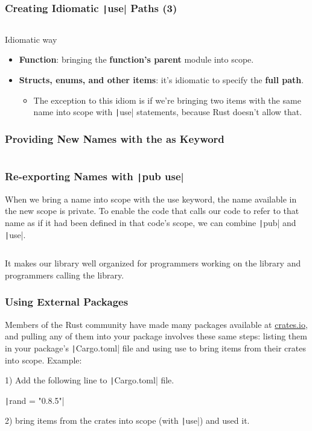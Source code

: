 \documentclass{beamer}
\begin{document}
\begin{frame}[fragile]
	\frametitle{Creating Idiomatic \texttt|use| Paths (3)}
	\inputminted[fontsize=\scriptsize]{rust}{./code/module10.rs}
	
	\begin{block}{Idiomatic way}
		\begin{itemize}
			\item 	\textbf{Function}: bringing the \textbf{function’s parent} module into scope.
			\item 	\textbf{Structs, enums, and other items}: it’s idiomatic to specify the \textbf{full path}.
			\begin{itemize}
				\item The exception to this idiom is if we’re bringing two items with the same name into scope with \texttt|use|  statements, because Rust doesn’t allow that.
			\end{itemize}
		\end{itemize}
	\end{block}
	
\end{frame}



\begin{frame}[fragile]
	\frametitle{Providing New Names with the as Keyword}
	\inputminted[fontsize=\scriptsize]{rust}{./code/module11.rs}
\end{frame}



\begin{frame}[fragile]
	\frametitle{Re-exporting Names with \texttt|pub use|}
	When we bring a name into scope with the use keyword, the name available in the new scope is private. To enable the code that calls our code to refer to that name as if it had been defined in that code’s scope, we can combine  \texttt|pub| and  \texttt|use|.
	
	\inputminted[fontsize=\scriptsize]{rust}{./code/module12.rs}
	
	\scriptsize
	It makes our library well organized for programmers working on the library and programmers calling the library. 
\end{frame}



\begin{frame}[fragile]
	\frametitle{Using External Packages}
	Members of the Rust community have made many packages available at \url{crates.io}, and pulling any of them into your package involves these same steps: listing them in your package’s \texttt|Cargo.toml| file and using use to bring items from their crates into scope. Example:
	
	1) Add the following line to \texttt|Cargo.toml| file.
	
	\texttt|rand = "0.8.5"|
	
	2) bring items from the crates into scope (with \texttt|use|) and used it.
	\inputminted{rust}{./code/module13.rs}
\end{frame}
\end{document}
